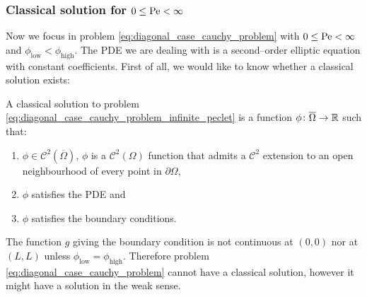\subsubsection{Classical solution for \texorpdfstring{$0 \leq \mathrm{Pe} <
\infty$}{finite Péclet's number}}

Now we focus in problem \eqref{eq:diagonal_case_cauchy_problem} with $0 \leq
\mathrm{Pe} < \infty$ and $\phi_\text{low} < \phi_\text{high}$. The PDE we are
dealing with is a second--order elliptic equation with constant coefficients.
First of all, we would like to know whether a classical solution exists:

\begin{definition*}
	A classical solution to problem
	\eqref{eq:diagonal_case_cauchy_problem_infinite_peclet} is a function $\phi
	\colon \overline{\Omega} \rightarrow \mathbb{R}$ such that:
	\begin{enumerate}[label={(\roman*)}, topsep=0pt]
		\item $\phi \in \mathcal{C}^2(\overline{\Omega})$, \ie $\phi$ is a
		$\mathcal{C}^2(\Omega)$ function that admits a $\mathcal{C}^2$ extension
		to an open neighbourhood of every point in $\partial \Omega$,
		\item $\phi$ satisfies the PDE and
		\item $\phi$ satisfies the boundary conditions.
	\end{enumerate}
\end{definition*}

\noindent
The function $g$ giving the boundary condition is not continuous at $(0,0)$ nor
at $(L, L)$ unless $\phi_\text{low} = \phi_\text{high}$. Therefore problem
\eqref{eq:diagonal_case_cauchy_problem} cannot have a classical solution,
however it might have a solution in the weak sense.

